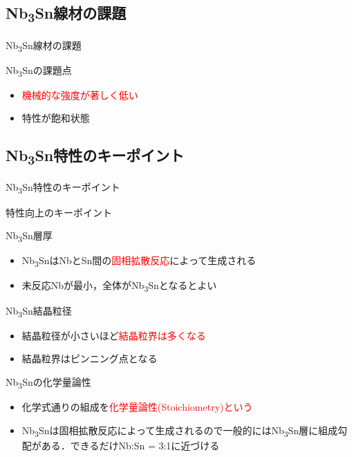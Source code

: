 \documentclass[aspectratio=169, unicode, 10pt]{beamer}
\begin{document}
	\subsection{Nb\textsubscript{3}Sn線材の課題}
	\begin{frame}{Nb\textsubscript{3}Sn線材の課題}
		\begin{block}{Nb\textsubscript{3}Snの課題点}
			\begin{itemize}
				\item \textcolor{red}{機械的な強度が著しく低い}
				\item 特性が飽和状態
			\end{itemize}
			\vspace{5mm}
		\end{block}
	\end{frame}

	\subsection{Nb\textsubscript{3}Sn特性のキーポイント}
	\begin{frame}{Nb\textsubscript{3}Sn特性のキーポイント}
		\begin{block}{特性向上のキーポイント}
			\begin{block}{Nb\textsubscript{3}Sn層厚}
				\begin{itemize}
					\item Nb\textsubscript{3}SnはNbとSn間の\textcolor{red}{固相拡散反応}によって生成される
					\item 未反応Nbが最小，全体がNb\textsubscript{3}Snとなるとよい
				\end{itemize}
			\end{block}
			\begin{block}{Nb\textsubscript{3}Sn結晶粒径}
				\begin{itemize}
					\item 結晶粒径が小さいほど\textcolor{red}{結晶粒界は多くなる}
					\item 結晶粒界はピンニング点となる
				\end{itemize}
			\end{block}
			\begin{block}{Nb\textsubscript{3}Snの化学量論性}
				\begin{itemize}
					\item 化学式通りの組成を\textcolor{red}{化学量論性(Stoichiometry)という}
					\item Nb\textsubscript{3}Snは固相拡散反応によって生成されるので一般的にはNb\textsubscript{3}Sn層に組成勾配がある．できるだけNb:Sn = 3:1に近づける
				\end{itemize}
			\end{block}
		\end{block}
	\end{frame}
\end{document}
